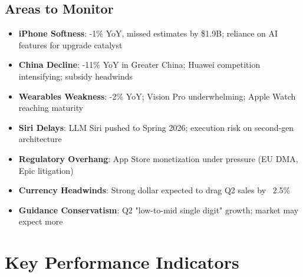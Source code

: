 \documentclass[11pt,a4paper]{article}
\begin{document}
\subsection{Areas to Monitor}

\begin{itemize}
    \item \textbf{iPhone Softness}: -1\% YoY, missed estimates by \$1.9B; reliance on AI features for upgrade catalyst
    \item \textbf{China Decline}: -11\% YoY in Greater China; Huawei competition intensifying; subsidy headwinds
    \item \textbf{Wearables Weakness}: -2\% YoY; Vision Pro underwhelming; Apple Watch reaching maturity
    \item \textbf{Siri Delays}: LLM Siri pushed to Spring 2026; execution risk on second-gen architecture
    \item \textbf{Regulatory Overhang}: App Store monetization under pressure (EU DMA, Epic litigation)
    \item \textbf{Currency Headwinds}: Strong dollar expected to drag Q2 sales by ~2.5\%
    \item \textbf{Guidance Conservatism}: Q2 "low-to-mid single digit" growth; market may expect more
\end{itemize}

\section{Key Performance Indicators}
\end{document}
